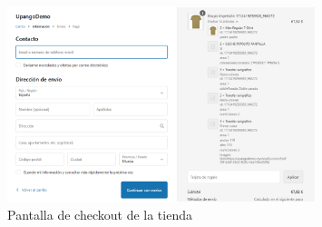 \documentclass[12pt]{article}
\begin{document}
\begin{figure}[ht]
    \centering
    \includegraphics[width=0.8\textwidth]{imagenes/ManualUsuario/ImagenCheckout.png}
    \caption{\label{fig:Checkout}Pantalla de checkout de la tienda}
    \vspace{\fill}
\end{figure}
\end{document}
